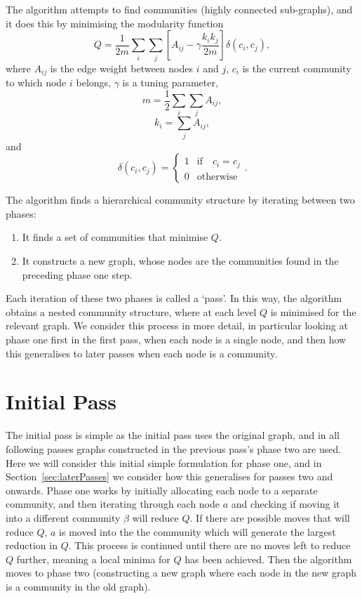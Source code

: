 \documentclass{article}
\begin{document}
The algorithm attempts to find communities (highly connected sub-graphs),
and it does this by minimising the modularity function
\begin{equation}
	Q = \frac{1}{2m}\sum_i\sum_j\left[ A_{ij} - \gamma \frac{k_ik_j}{2m} \right] \delta(c_i,c_j),
\end{equation}
where $A_{ij}$ is the edge weight between nodes $i$ and $j$, 
$c_i$ is the current community to which node $i$ belongs,
$\gamma$ is a tuning parameter,
\begin{equation}
m = \frac{1}{2}\sum_i\sum_jA_{ij},
\end{equation}
\begin{equation}
k_i = \sum_j{A_{ij}},
\end{equation}
and 
\begin{equation}
	\delta(c_i,c_j) = \left \{ \begin{array}{ll}
	1 & \text{if} \quad  c_i = c_j \\
	0 & \text{otherwise} \end{array} \right ..
\end{equation}

The algorithm finds a hierarchical community structure by iterating 
between two phases:
\begin{enumerate}
	\item It finds a set of communities that minimise $Q$.
	\item It constructs a new graph, whose nodes are the communities 
	found in the preceding phase one step.
\end{enumerate}
Each iteration of these two phases is called a `pass'.
In this way, the algorithm obtains a nested community structure, 
where at each level $Q$ is minimised for the relevant graph.
We consider this process in more detail, in particular looking 
at phase one first in the first pass, when each node is a single
node, and then how this generalises to later passes when each node 
is a community.


\section{Initial Pass}
\label{sec:initialPass}

The initial pass is simple as the initial pass uses the original graph, 
and in all following passes graphs constructed in the previous pass's 
phase two are used.
Here we will consider this initial simple formulation for phase one, and
in Section~\ref{sec:laterPasses} we consider how this generalises for 
passes two and onwards. 
Phase one works by initially allocating each node to a separate community,
and then iterating through each node $a$ and checking if moving it into 
a different community $\beta$ will reduce $Q$.
If there are possible moves that will reduce $Q$, $a$ is moved into the 
the community which will generate the largest reduction in $Q$. 
This process is continued until there are no moves left to reduce $Q$ 
further, meaning a local minima for $Q$ has been achieved. 
Then the algorithm moves to phase two (constructing a new graph where
each node in the new graph is a community in the old graph). 
\end{document}
